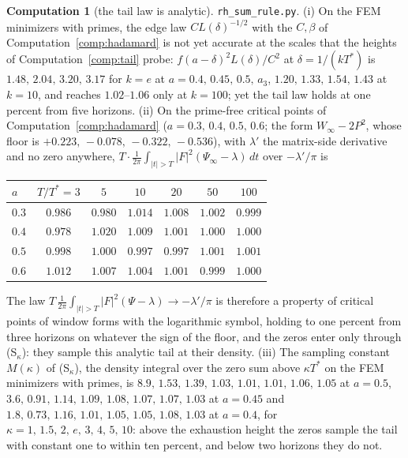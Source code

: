 \documentclass[11pt]{article}
\theoremstyle{definition}
\newtheorem{computation}[theorem]{Computation}
\theoremstyle{remark}
\newcommand{\Tst}{T^{*}}
\begin{document}
\begin{computation}[the tail law is analytic]\label{comp:analytic}
\texttt{rh\_sum\_rule.py}. (i) On the FEM minimizers with primes, the edge law $CL(\delta)^{-1/2}$ with the $C,\beta$ of Computation~\ref{comp:hadamard} is not yet accurate at the scales that the heights of Computation~\ref{comp:tail} probe: $f(a-\delta)^2L(\delta)/C^2$ at $\delta=1/(k\Tst)$ is $1.48,\,2.04,\,3.20,\,3.17$ for $k=e$ at $a=0.4,\,0.45,\,0.5,\,a_3$, $1.20,\,1.33,\,1.54,\,1.43$ at $k=10$, and reaches $1.02$--$1.06$ only at $k=100$; yet the tail law holds at one percent from five horizons. (ii) On the prime-free critical points of Computation~\ref{comp:hadamard} ($a=0.3,\,0.4,\,0.5,\,0.6$; the form $W_\infty-2P^2$, whose floor is $+0.223,\,-0.078,\,-0.322,\,-0.536$), with $\lambda'$ the matrix-side derivative and no zero anywhere, $T\cdot\frac1{2\pi}\int_{|t|>T}|F|^2(\Psi_\infty-\lambda)\,dt$ over $-\lambda'/\pi$ is
\begin{center}\footnotesize
\begin{tabular}{@{}lcccccc@{}}
\toprule
$a$ & $T/\Tst=3$ & $5$ & $10$ & $20$ & $50$ & $100$\\
\midrule
$0.3$ & $0.986$ & $0.980$ & $1.014$ & $1.008$ & $1.002$ & $0.999$\\
$0.4$ & $0.978$ & $1.020$ & $1.009$ & $1.001$ & $1.000$ & $1.000$\\
$0.5$ & $0.998$ & $1.000$ & $0.997$ & $0.997$ & $1.001$ & $1.001$\\
$0.6$ & $1.012$ & $1.007$ & $1.004$ & $1.001$ & $0.999$ & $1.000$\\
\bottomrule
\end{tabular}
\end{center}
The law $T\,\frac1{2\pi}\int_{|t|>T}|F|^2(\Psi-\lambda)\to-\lambda'/\pi$ is therefore a property of critical points of window forms with the logarithmic symbol, holding to one percent from three horizons on whatever the sign of the floor, and the zeros enter only through (S$_\kappa$): they sample this analytic tail at their density. (iii) The sampling constant $M(\kappa)$ of (S$_\kappa$), the density integral over the zero sum above $\kappa\Tst$ on the FEM minimizers with primes, is $8.9,\,1.53,\,1.39,\,1.03,\,1.01,\,1.01,\,1.06,\,1.05$ at $a=0.5$, $3.6,\,0.91,\,1.14,\,1.09,\,1.08,\,1.07,\,1.07,\,1.03$ at $a=0.45$ and $1.8,\,0.73,\,1.16,\,1.01,\,1.05,\,1.05,\,1.08,\,1.03$ at $a=0.4$, for $\kappa=1,\,1.5,\,2,\,e,\,3,\,4,\,5,\,10$: above the exhaustion height the zeros sample the tail with constant one to within ten percent, and below two horizons they do not.
\end{computation}
\end{document}
